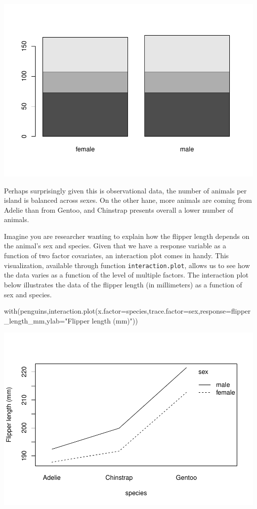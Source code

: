 \documentclass[
]{book}
\newenvironment{Shaded}{\begin{snugshade}}{\end{snugshade}}
\newcommand{\AttributeTok}[1]{\textcolor[rgb]{0.77,0.63,0.00}{#1}}
\newcommand{\FunctionTok}[1]{\textcolor[rgb]{0.00,0.00,0.00}{#1}}
\newcommand{\NormalTok}[1]{#1}
\newcommand{\StringTok}[1]{\textcolor[rgb]{0.31,0.60,0.02}{#1}}
\begin{document}
\includegraphics{ECOMODbook_files/figure-latex/a8.38-1.pdf}

Perhaps surprisingly given this is observational data, the number of animals per island is balanced across sexes. On the other hane, more animals are coming from Adelie than from Gentoo, and Chinstrap presents overall a lower number of animals.

Imagine you are researcher wanting to explain how the flipper length depends on the animal's sex and species. Given that we have a response variable as a function of two factor covariates, an interaction plot comes in handy. This visualization, available through function \texttt{interaction.plot}, allows us to see how the data varies as a function of the level of multiple factors. The interaction plot below illustrates the data of the flipper length (in millimeters) as a function of sex and species.

\begin{Shaded}
\begin{Highlighting}[]
\FunctionTok{with}\NormalTok{(penguins,}\FunctionTok{interaction.plot}\NormalTok{(}\AttributeTok{x.factor=}\NormalTok{species,}\AttributeTok{trace.factor=}\NormalTok{sex,}\AttributeTok{response=}\NormalTok{flipper\_length\_mm,}\AttributeTok{ylab=}\StringTok{"Flipper length (mm)"}\NormalTok{))}
\end{Highlighting}
\end{Shaded}

\includegraphics{ECOMODbook_files/figure-latex/a8.39-1.pdf}
\end{document}
